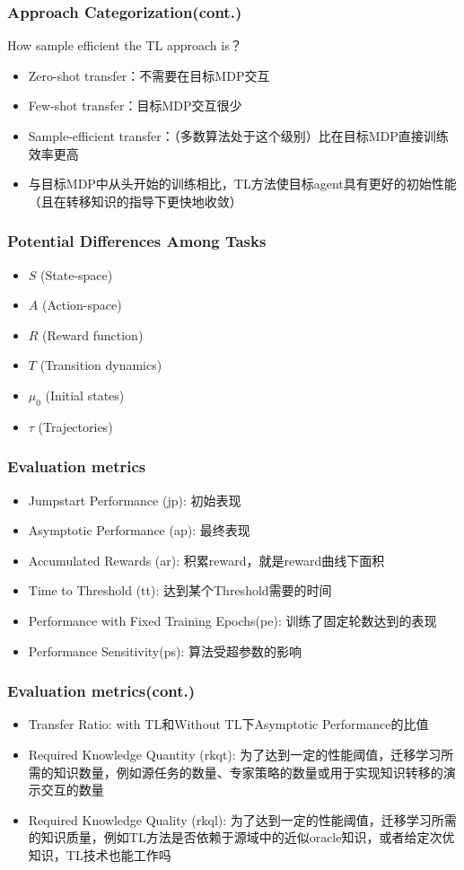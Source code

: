 \documentclass[aspectratio=169]{beamer}
\begin{document}
\begin{frame}
  \frametitle{Approach Categorization(cont.)}
  How sample efficient the TL approach is？
  \begin{itemize}
    \item Zero-shot transfer：不需要在目标MDP交互
    \item Few-shot transfer：目标MDP交互很少
    \item Sample-efficient transfer：（多数算法处于这个级别）比在目标MDP直接训练效率更高
    \item 与目标MDP中从头开始的训练相比，TL方法使目标agent具有更好的初始性能（且在转移知识的指导下更快地收敛）  \end{itemize}
\end{frame}

\begin{frame}
  \frametitle{Potential Differences Among Tasks}
  \begin{itemize}
    \item $S$ (State-space)
    \item $A$ (Action-space)
    \item $R$ (Reward function)
    \item $T$ (Transition dynamics)
    \item $\mu_0$ (Initial states)
    \item $\tau$ (Trajectories)
  \end{itemize}
\end{frame}

\begin{frame}
  \frametitle{Evaluation metrics}
  \begin{itemize}
    \item Jumpstart Performance (jp): 初始表现
    \item Asymptotic Performance (ap): 最终表现
    \item Accumulated Rewards (ar): 积累reward，就是reward曲线下面积
    \item Time to Threshold (tt): 达到某个Threshold需要的时间
    \item Performance with Fixed Training Epochs(pe): 训练了固定轮数达到的表现
    \item Performance Sensitivity(ps): 算法受超参数的影响
  \end{itemize}
  
\end{frame}

\begin{frame}
  \frametitle{Evaluation metrics(cont.)}
  \begin{itemize}
    \item Transfer Ratio: with TL和Without TL下Asymptotic Performance的比值
    \item Required Knowledge Quantity (rkqt): 为了达到一定的性能阈值，迁移学习所需的知识数量，例如源任务的数量、专家策略的数量或用于实现知识转移的演示交互的数量
    \item Required Knowledge Quality (rkql): 为了达到一定的性能阈值，迁移学习所需的知识质量，例如TL方法是否依赖于源域中的近似oracle知识，或者给定次优知识，TL技术也能工作吗
  \end{itemize}
\end{frame}
\end{document}
